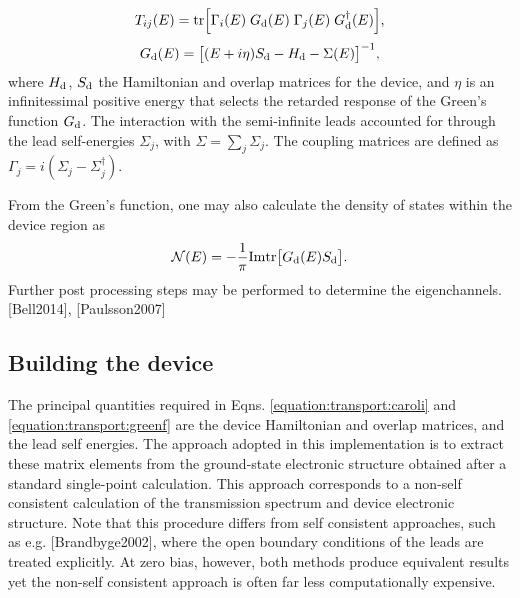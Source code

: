 \documentclass[letterpaper,10pt,english]{sphinxmanual}
\begin{document}
\label{\detokenize{transport:equation-caroli}}\begin{equation}\label{equation:transport:caroli}
\begin{split}   T_{ij}(E) = \mathrm{tr}\Big[\Gamma_i(E)\;G_{\rm d}(E)\;\Gamma_j(E)\;G_{\rm d}^{\dagger}(E)\Big],\end{split}
\end{equation}\label{\detokenize{transport:equation-greenf}}\begin{equation}\label{equation:transport:greenf}
\begin{split}   G_{\rm d}(E) = \big[ (E+i\eta)S_{\rm d} - H_{\rm d} - \Sigma(E)\big]^{-1},\end{split}
\end{equation}
where \(H_{\rm d}\), \(S_{\rm d}\) the
Hamiltonian and overlap matrices for the device, and \(\eta\) is an
infinitessimal positive energy that selects the retarded response of the
Green’s function \(G_{\rm d}\). The interaction with the
semi-infinite leads accounted for through the lead self-energies
\(\Sigma_j\), with
\(\Sigma = \sum_j \Sigma_j\). The coupling
matrices are defined as
\(\Gamma_j = i(\Sigma_j - \Sigma_j^{\dagger})\).

From the Green’s function, one may also calculate the density of states
within the device region as
\begin{equation*}
\begin{split}\mathcal{N}(E) = -\frac{1}{\pi}{\mathrm{Im}}\mathrm{tr}\big[G_{\rm d}(E) S_{\rm d}\big].\end{split}
\end{equation*}
Further post processing steps may be performed to determine the
eigenchannels. {[}Bell2014{]}, {[}Paulsson2007{]}


\subsection{Building the device}
\label{\detokenize{transport:building-the-device}}
The principal quantities required in Eqns. \eqref{equation:transport:caroli} and \eqref{equation:transport:greenf}
are the device Hamiltonian and overlap matrices, and the lead self
energies. The approach adopted in this implementation is to extract
these matrix elements from the ground-state electronic structure
obtained after a standard single-point calculation. This approach
corresponds to a non-self consistent calculation of the transmission
spectrum and device electronic structure. Note that this procedure
differs from self consistent approaches, such as e.g.
{[}Brandbyge2002{]}, where the open boundary conditions of
the leads are treated explicitly. At zero bias, however, both methods
produce equivalent results yet the non-self consistent approach is often
far less computationally expensive.
\end{document}
